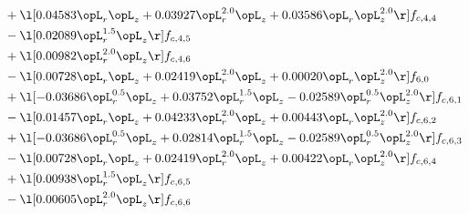 \begin{alignat}{2}
& + \l[  0.04583 \opL_r \opL_z +  0.03927 \opL_r^{2.0} \opL_z +  0.03586 \opL_r \opL_z^{2.0}  \r] f_{c,4,4} \nonumber \\ 
& - \l[  0.02089 \opL_r^{1.5} \opL_z  \r] f_{c,4,5} \nonumber \\ 
& + \l[  0.00982 \opL_r^{2.0} \opL_z  \r] f_{c,4,6} \nonumber \\ 
& - \l[  0.00728 \opL_r \opL_z +  0.02419 \opL_r^{2.0} \opL_z +  0.00020 \opL_r \opL_z^{2.0}  \r] f_{6,0} \nonumber \\ 
& + \l[  -0.03686 \opL_r^{0.5} \opL_z +  0.03752 \opL_r^{1.5} \opL_z   -0.02589 \opL_r^{0.5} \opL_z^{2.0}  \r] f_{c,6,1} \nonumber \\ 
& - \l[  0.01457 \opL_r \opL_z +  0.04233 \opL_r^{2.0} \opL_z +  0.00443 \opL_r \opL_z^{2.0}  \r] f_{c,6,2} \nonumber \\ 
& + \l[  -0.03686 \opL_r^{0.5} \opL_z +  0.02814 \opL_r^{1.5} \opL_z   -0.02589 \opL_r^{0.5} \opL_z^{2.0}  \r] f_{c,6,3} \nonumber \\ 
& - \l[  0.00728 \opL_r \opL_z +  0.02419 \opL_r^{2.0} \opL_z +  0.00422 \opL_r \opL_z^{2.0}  \r] f_{c,6,4} \nonumber \\ 
& + \l[  0.00938 \opL_r^{1.5} \opL_z  \r] f_{c,6,5} \nonumber \\ 
& - \l[  0.00605 \opL_r^{2.0} \opL_z  \r] f_{c,6,6} \nonumber \\ 
\end{alignat} 


